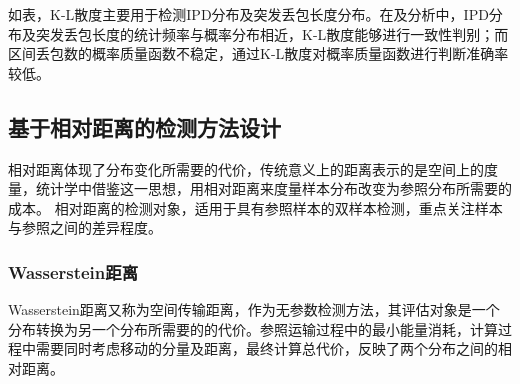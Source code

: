 
如表，K-L散度主要用于检测IPD分布及突发丢包长度分布。在及分析中，IPD分布及突发丢包长度的统计频率与概率分布相近，K-L散度能够进行一致性判别；而区间丢包数的概率质量函数不稳定，通过K-L散度对概率质量函数进行判断准确率较低。

\subsection{基于相对距离的检测方法设计}
\label{chap:analyze:statistical:distance}

相对距离体现了分布变化所需要的代价，传统意义上的距离表示的是空间上的度量，统计学中借鉴这一思想，用相对距离来度量样本分布改变为参照分布所需要的成本。
相对距离的检测对象，适用于具有参照样本的双样本检测，重点关注样本与参照之间的差异程度。

\subsubsection{Wasserstein距离}
\label{chap:analyze:statistical:distance:wasserstein}

Wasserstein距离又称为空间传输距离，作为无参数检测方法，其评估对象是一个分布转换为另一个分布所需要的的代价。参照运输过程中的最小能量消耗，计算过程中需要同时考虑移动的分量及距离，最终计算总代价，反映了两个分布之间的相对距离。


